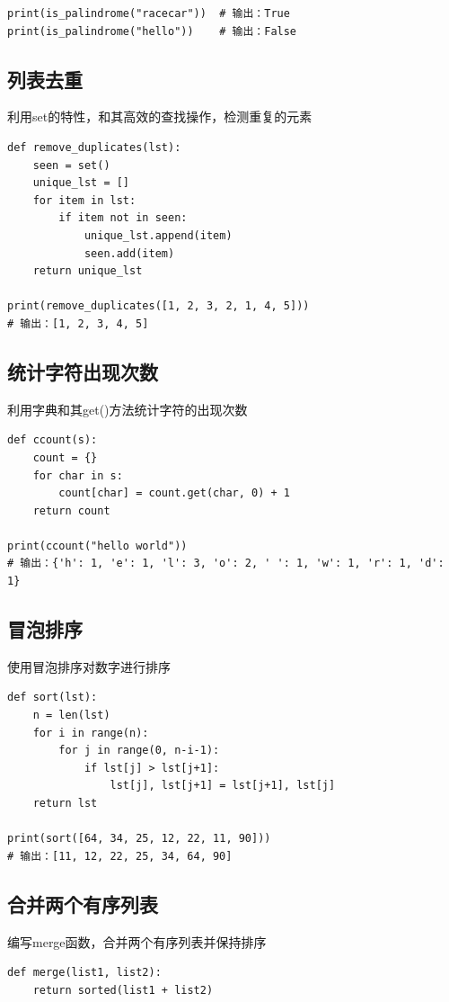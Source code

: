 \documentclass[UTF8,a4paper]{ctexart}
\begin{document}
\begin{sloppypar}
\begin{lstlisting}
print(is_palindrome("racecar"))  # 输出：True
print(is_palindrome("hello"))    # 输出：False

\end{lstlisting}

	
\subsection{列表去重}
	利用set的特性，和其高效的查找操作，检测重复的元素
\begin{lstlisting}
def remove_duplicates(lst):
    seen = set()
    unique_lst = []
    for item in lst:
        if item not in seen:
            unique_lst.append(item)
            seen.add(item)
    return unique_lst

print(remove_duplicates([1, 2, 3, 2, 1, 4, 5]))  
# 输出：[1, 2, 3, 4, 5]

\end{lstlisting}

\subsection{统计字符出现次数}
	利用字典和其get()方法统计字符的出现次数
\begin{lstlisting}
def ccount(s):
    count = {}
    for char in s:
        count[char] = count.get(char, 0) + 1
    return count

print(ccount("hello world")) 
# 输出：{'h': 1, 'e': 1, 'l': 3, 'o': 2, ' ': 1, 'w': 1, 'r': 1, 'd': 1}

\end{lstlisting}

\subsection{冒泡排序}
	使用冒泡排序对数字进行排序
\begin{lstlisting}
def sort(lst):
    n = len(lst)
    for i in range(n):
        for j in range(0, n-i-1):
            if lst[j] > lst[j+1]:
                lst[j], lst[j+1] = lst[j+1], lst[j]
    return lst

print(sort([64, 34, 25, 12, 22, 11, 90]))
# 输出：[11, 12, 22, 25, 34, 64, 90]
\end{lstlisting}

\subsection{合并两个有序列表}
	编写merge函数，合并两个有序列表并保持排序
\begin{lstlisting}
def merge(list1, list2):
    return sorted(list1 + list2)


\end{lstlisting}
\end{sloppypar}
\end{document}
